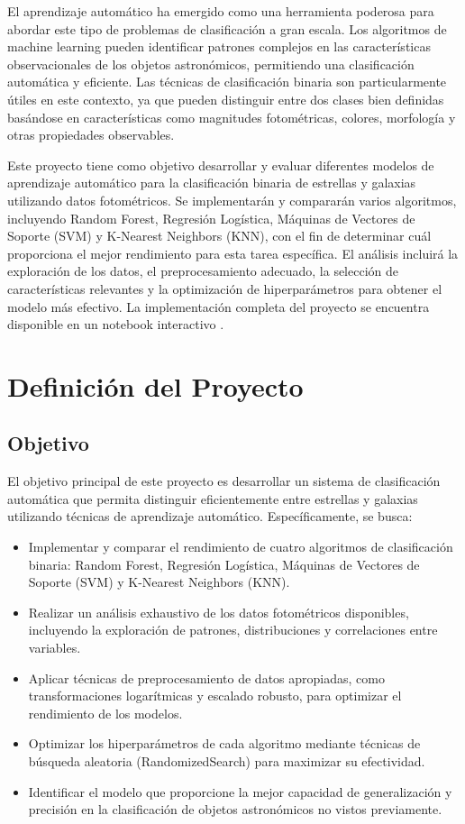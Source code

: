 \documentclass{article}
\begin{document}
El aprendizaje automático ha emergido como una herramienta poderosa para abordar este tipo de problemas de clasificación a gran escala. Los algoritmos de machine learning pueden identificar patrones complejos en las características observacionales de los objetos astronómicos, permitiendo una clasificación automática y eficiente. Las técnicas de clasificación binaria son particularmente útiles en este contexto, ya que pueden distinguir entre dos clases bien definidas basándose en características como magnitudes fotométricas, colores, morfología y otras propiedades observables.

Este proyecto tiene como objetivo desarrollar y evaluar diferentes modelos de aprendizaje automático para la clasificación binaria de estrellas y galaxias utilizando datos fotométricos. Se implementarán y compararán varios algoritmos, incluyendo Random Forest, Regresión Logística, Máquinas de Vectores de Soporte (SVM) y K-Nearest Neighbors (KNN), con el fin de determinar cuál proporciona el mejor rendimiento para esta tarea específica. El análisis incluirá la exploración de los datos, el preprocesamiento adecuado, la selección de características relevantes y la optimización de hiperparámetros para obtener el modelo más efectivo. La implementación completa del proyecto se encuentra disponible en un notebook interactivo \cite{colab_notebook}.


\section{Definición del Proyecto}

\subsection{Objetivo}

El objetivo principal de este proyecto es desarrollar un sistema de clasificación automática que permita distinguir eficientemente entre estrellas y galaxias utilizando técnicas de aprendizaje automático. Específicamente, se busca:

\begin{itemize}
    \item Implementar y comparar el rendimiento de cuatro algoritmos de clasificación binaria: Random Forest, Regresión Logística, Máquinas de Vectores de Soporte (SVM) y K-Nearest Neighbors (KNN).
    \item Realizar un análisis exhaustivo de los datos fotométricos disponibles, incluyendo la exploración de patrones, distribuciones y correlaciones entre variables.
    \item Aplicar técnicas de preprocesamiento de datos apropiadas, como transformaciones logarítmicas y escalado robusto, para optimizar el rendimiento de los modelos.
    \item Optimizar los hiperparámetros de cada algoritmo mediante técnicas de búsqueda aleatoria (RandomizedSearch) para maximizar su efectividad.
    \item Identificar el modelo que proporcione la mejor capacidad de generalización y precisión en la clasificación de objetos astronómicos no vistos previamente.
\end{itemize}
\end{document}
